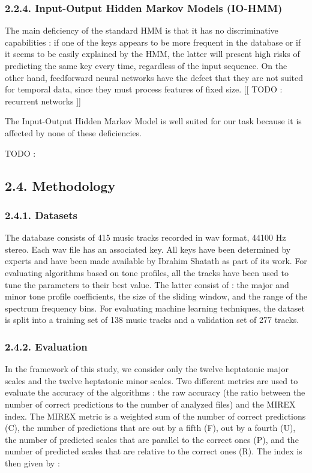 \documentclass[letterpaper]{article}
\begin{document}
\subsubsection*{2.2.4. Input-Output Hidden Markov Models (IO-HMM)}

The main deficiency of the standard HMM is that it has no discriminative capabilities : if one of the keys appears to be more frequent in the database or
if it seems to be easily explained by the HMM, the latter will present high risks of predicting the same key every time, regardless of the
input sequence. On the other hand, feedforward neural networks have the defect that they are not suited for temporal data, since they must 
process features of fixed size. [[ TODO : recurrent networks ]]

The Input-Output Hidden Markov Model is well suited for our task because it is affected by none of these deficiencies.

TODO : \citep{YB}

\subsection*{2.4. Methodology}

\subsubsection{2.4.1. Datasets}

The database consists of 415 music tracks recorded in wav format, 44100 Hz stereo. Each wav file has an associated key. All keys have been determined
by experts and have been made available by Ibrahim Shat\textquotesingle ath as part of its work. For evaluating algorithms based on tone profiles,
all the tracks have been used to tune the parameters to their best value. The latter consist of : the major and minor tone profile coefficients,
the size of the sliding window, and the range of the spectrum frequency bins. For evaluating machine learning techniques,
the dataset is split into a training set of 138 music tracks and a validation set of 277 tracks.

\subsubsection{2.4.2. Evaluation}

In the framework of this study, we consider only the twelve heptatonic major scales and the twelve heptatonic minor scales.
Two different metrics are used to evaluate the accuracy of the algorithms :
the raw accuracy (the ratio between the number of correct predictions to the number of analyzed files) and the MIREX index.
The MIREX metric is a weighted sum of the number of correct predictions (C), the number of predictions that are out by a fifth (F), 
out by a fourth (U), the number of predicted scales that are parallel to the correct ones (P), and the number of predicted scales
that are relative to the correct ones (R). The index is then given by : \\
\end{document}
